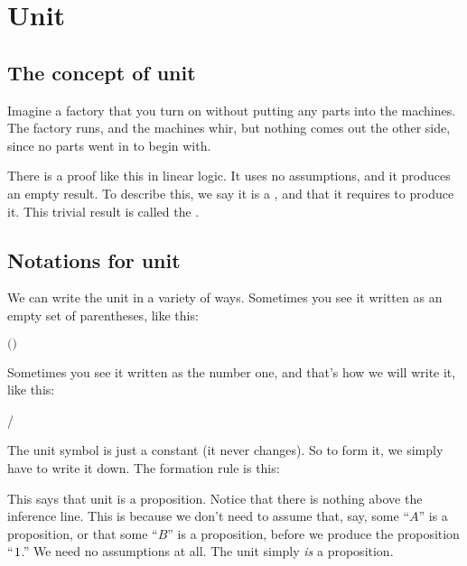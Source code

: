 \documentclass[../../../main.tex]{subfiles}
\begin{document}
\chapter{Unit}


\section{The concept of unit}

Imagine a factory that you turn on without putting any parts into the machines. The factory runs, and the machines whir, but nothing comes out the other side, since no parts went in to begin with.

There is a proof like this in linear logic. It uses no assumptions, and it produces an empty result. To describe this, we say it is a , and that it requires  to produce it. This trivial result is called the . 


\section{Notations for unit}

We can write the unit in a variety of ways. Sometimes you see it written as an empty set of parentheses, like this:

\begin{center}
  $\textsf{()}$
\end{center}

\noindent
Sometimes you see it written as the number one, and that's how we will write it, like this:

\begin{center}
  \unit/
\end{center}

\noindent
The unit symbol is just a constant (it never changes). So to form it, we simply have to write it down. The formation rule is this:

\begin{prooftree*}
  \hypo{}
\end{prooftree*}

\noindent
This says that unit is a proposition. Notice that there is nothing above the inference line. This is because we don't need to assume that, say, some ``$A$'' is a proposition, or that some ``$B$'' is a proposition, before we produce the proposition ``$\unit/$.'' We need no assumptions at all. The unit simply \emph{is} a proposition.
\end{document}
